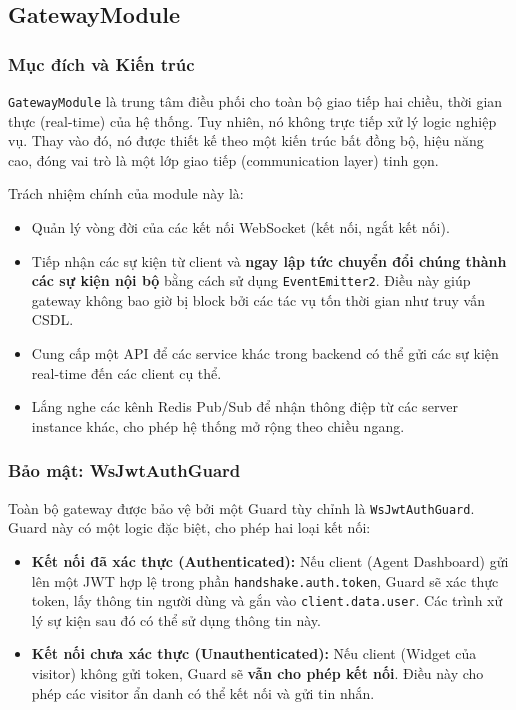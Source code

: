 \subsection{GatewayModule}
\label{subsec:gateway-module}

\subsubsection{Mục đích và Kiến trúc}

\texttt{GatewayModule} là trung tâm điều phối cho toàn bộ giao tiếp hai chiều, thời gian thực (real-time) của hệ thống. Tuy nhiên, nó không trực tiếp xử lý logic nghiệp vụ. Thay vào đó, nó được thiết kế theo một kiến trúc bất đồng bộ, hiệu năng cao, đóng vai trò là một lớp giao tiếp (communication layer) tinh gọn.

Trách nhiệm chính của module này là:
\begin{itemize}
    \item Quản lý vòng đời của các kết nối WebSocket (kết nối, ngắt kết nối).
    \item Tiếp nhận các sự kiện từ client và \textbf{ngay lập tức chuyển đổi chúng thành các sự kiện nội bộ} bằng cách sử dụng \texttt{EventEmitter2}. Điều này giúp gateway không bao giờ bị block bởi các tác vụ tốn thời gian như truy vấn CSDL.
    \item Cung cấp một API để các service khác trong backend có thể gửi các sự kiện real-time đến các client cụ thể.
    \item Lắng nghe các kênh Redis Pub/Sub để nhận thông điệp từ các server instance khác, cho phép hệ thống mở rộng theo chiều ngang.
\end{itemize}

\subsubsection{Bảo mật: WsJwtAuthGuard}
Toàn bộ gateway được bảo vệ bởi một Guard tùy chỉnh là \texttt{WsJwtAuthGuard}. Guard này có một logic đặc biệt, cho phép hai loại kết nối:
\begin{itemize}
    \item \textbf{Kết nối đã xác thực (Authenticated):} Nếu client (Agent Dashboard) gửi lên một JWT hợp lệ trong phần \texttt{handshake.auth.token}, Guard sẽ xác thực token, lấy thông tin người dùng và gắn vào \texttt{client.data.user}. Các trình xử lý sự kiện sau đó có thể sử dụng thông tin này.
    \item \textbf{Kết nối chưa xác thực (Unauthenticated):} Nếu client (Widget của visitor) không gửi token, Guard sẽ \textbf{vẫn cho phép kết nối}. Điều này cho phép các visitor ẩn danh có thể kết nối và gửi tin nhắn.
\end{itemize}

